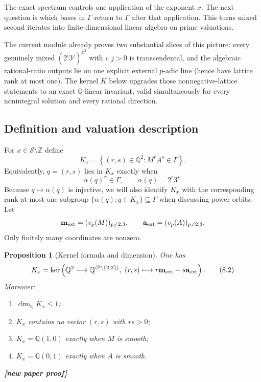 \documentclass[11pt,oneside]{article}
\newtheorem{proposition}[theorem]{Proposition}
\theoremstyle{definition}
\theoremstyle{remark}
\newcommand{\Z}{\mathbb Z}
\newcommand{\Q}{\mathbb Q}
\newcommand{\Sol}{\mathcal S}
\newcommand{\vpp}[2]{v_{#1}\!\left(#2\right)}
\newcommand{\lean}[1]{\path{#1}}
\newcommand{\statusnew}{\textcolor{NewViolet}{\textbf{[new paper proof]}}}
\begin{document}
The exact spectrum controls one application of the exponent $x$.  The next question is which
bases in $\Gamma$ return to $\Gamma$ after that application.  This turns mixed second
iterates into finite-dimensional linear algebra on prime valuations.

The current module \lean{AlgebraicOutputLocus} already proves two substantial slices of this
picture: every genuinely mixed $(2^i3^j)^{x^2}$ with $i,j>0$ is transcendental, and the
algebraic rational-ratio outputs lie on one explicit external $p$-adic line (hence have
lattice rank at most one).  The kernel $K$ below upgrades those nonnegative-lattice statements
to an exact $\Q$-linear invariant, valid simultaneously for every nonintegral solution and
every rational direction.

\subsection{Definition and valuation description}

For $x\in\Sol\setminus\Z$ define
\[
 K_x=\left\{(r,s)\in\Q^2:M^rA^s\in\Gamma\right\}.
                                                        \tag{8.1}\label{eq:K-def}
\]
Equivalently, $q=(r,s)$ lies in $K_x$ exactly when
\[
  \alpha(q)^x\in\Gamma,
  \qquad \alpha(q)=2^r3^s.
\]
Because $q\mapsto\alpha(q)$ is injective, we will also identify $K_x$ with the corresponding
rank-at-most-one subgroup $\{\alpha(q):q\in K_x\}\subseteq\Gamma$ when discussing
power orbits.
Let
\[
 \mathbf m_{\rm ext}=(\vpp pM)_{p\ne2,3},
 \qquad
 \mathbf a_{\rm ext}=(\vpp pA)_{p\ne2,3}.
\]
Only finitely many coordinates are nonzero.

\begin{proposition}[Kernel formula and dimension]\label{prop:K-dimension}
One has
\[
 K_x=\ker\left(
   \Q^2\longrightarrow\Q^{(\mathbb P\setminus\{2,3\})},
   \ (r,s)\longmapsto r\mathbf m_{\rm ext}+s\mathbf a_{\rm ext}
 \right).
                                                        \tag{8.2}\label{eq:K-valuations}
\]
Moreover:
\begin{enumerate}
\item $\dim_\Q K_x\le1$;
\item $K_x$ contains no vector $(r,s)$ with $rs>0$;
\item $K_x=\Q(1,0)$ exactly when $M$ is smooth;
\item $K_x=\Q(0,1)$ exactly when $A$ is smooth.
\end{enumerate}
\statusnew
\end{proposition}
\end{document}

